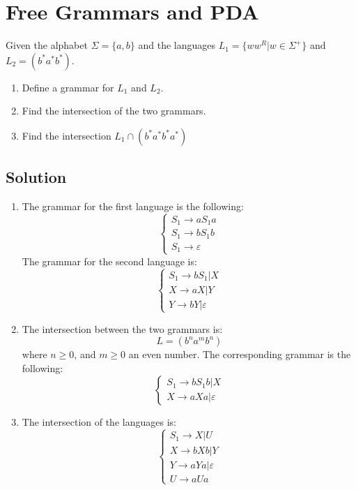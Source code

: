 \documentclass[12pt, a4paper]{report}
\newtheorem[style=M, bodystyle=\normalfont]{theorem}{Theorem}
\newtheorem[style=M, bodystyle=\normalfont]{corollary}{Corollary}
\newtheorem[style=M, bodystyle=\normalfont]{lemma}{Lemma}
\newtheorem[style=M, bodystyle=\normalfont]{definition}{Definition}
\begin{document}
    \section{Free Grammars and PDA}
        Given the alphabet $\Sigma=\{a,b\}$ and the languages $L_1=\{ww^R|w \in \Sigma^{+}\}$ and $L_2=(b^{*}a^{*}b^{*})$.
        \begin{enumerate}
            \item Define a grammar for $L_1$ and $L_2$. 
            \item Find the intersection of the two grammars. 
            \item Find the intersection $L_1 \cap (b^{*}a^{*}b^{*}a^{*})$
        \end{enumerate}
    \subsection*{Solution}
    \begin{enumerate}
        \item The grammar for the first language is the following: 
            \[\begin{cases}
                S_1 \rightarrow aS_1a           \\
                S_1 \rightarrow bS_1b           \\
                S_1 \rightarrow \varepsilon
            \end{cases}\]
            The grammar for the second language is: 
            \[\begin{cases}
                S_1 \rightarrow bS_1|X          \\
                X \rightarrow aX|Y              \\
                Y \rightarrow bY|\varepsilon
            \end{cases}\]
        \item The intersection between the two grammars is: 
            \[L=(b^na^mb^n)\]
            where $n \geq 0$, and $m \geq 0$ an even number. The corresponding grammar is the following: 
            \[\begin{cases}
                S_1 \rightarrow bS_1b | X \\
                X \rightarrow aXa | \varepsilon
            \end{cases}\]
        \item The intersection of the languages is: 
            \[\begin{cases}
                S_1 \rightarrow X | U               \\
                X \rightarrow bXb | Y               \\
                Y \rightarrow aYa | \varepsilon     \\
                U \rightarrow aUa   
            \end{cases}\]
    \end{enumerate}
\end{document}
